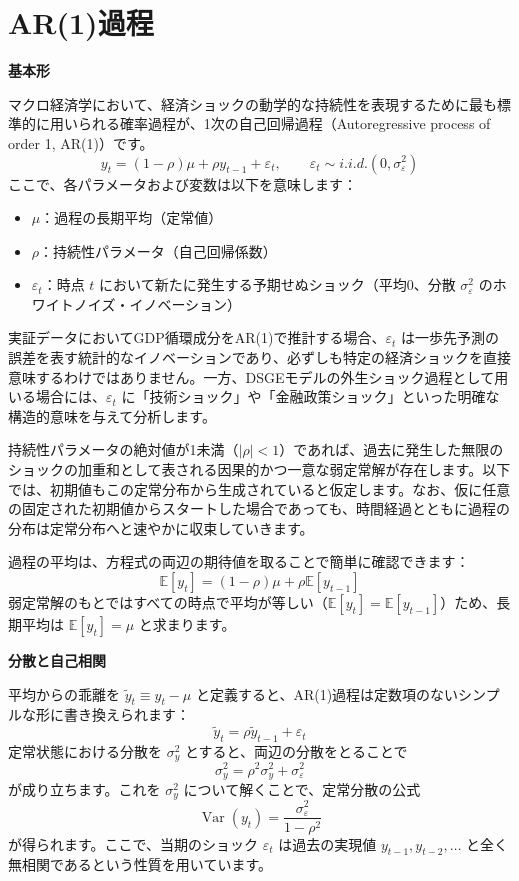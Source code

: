 \documentclass[
  japanese,
  lualatex,
  ja=standard,
  12pt,
  a4paper]{ltjsarticle}
\providecommand{\tightlist}{%
  \setlength{\itemsep}{0pt}\setlength{\parskip}{0pt}}
\begin{document}
\section{AR(1)過程}\label{ar1ux904eux7a0b}

\textbf{基本形}

マクロ経済学において、経済ショックの動学的な持続性を表現するために最も標準的に用いられる確率過程が、1次の自己回帰過程（Autoregressive
process of order 1, AR(1)）です。 \[
y_t=(1-\rho)\mu+\rho y_{t-1}+\varepsilon_t,
\qquad
\varepsilon_t\sim i.i.d.(0,\sigma_\varepsilon^2)
\] ここで、各パラメータおよび変数は以下を意味します：

\begin{itemize}
\tightlist
\item
  \(\mu\)：過程の長期平均（定常値）
\item
  \(\rho\)：持続性パラメータ（自己回帰係数）
\item
  \(\varepsilon_t\)：時点 \(t\)
  において新たに発生する予期せぬショック（平均0、分散
  \(\sigma_\varepsilon^2\) のホワイトノイズ・イノベーション）
\end{itemize}

実証データにおいてGDP循環成分をAR(1)で推計する場合、\(\varepsilon_t\)
は一歩先予測の誤差を表す統計的なイノベーションであり、必ずしも特定の経済ショックを直接意味するわけではありません。一方、DSGEモデルの外生ショック過程として用いる場合には、\(\varepsilon_t\)
に「技術ショック」や「金融政策ショック」といった明確な構造的意味を与えて分析します。

持続性パラメータの絶対値が1未満（\(|\rho|<1\)）であれば、過去に発生した無限のショックの加重和として表される因果的かつ一意な弱定常解が存在します。以下では、初期値もこの定常分布から生成されていると仮定します。なお、仮に任意の固定された初期値からスタートした場合であっても、時間経過とともに過程の分布は定常分布へと速やかに収束していきます。

過程の平均は、方程式の両辺の期待値を取ることで簡単に確認できます： \[
\mathbb{E}[y_t]
=
(1-\rho)\mu+\rho\mathbb{E}[y_{t-1}]
\]
弱定常解のもとではすべての時点で平均が等しい（\(\mathbb{E}[y_t]=\mathbb{E}[y_{t-1}]\)）ため、長期平均は
\(\mathbb{E}[y_t]=\mu\) と求まります。

\textbf{分散と自己相関}

平均からの乖離を \(\tilde{y}_t\equiv y_t-\mu\)
と定義すると、AR(1)過程は定数項のないシンプルな形に書き換えられます： \[
\tilde{y}_t=\rho\tilde{y}_{t-1}+\varepsilon_t
\] 定常状態における分散を \(\sigma_y^2\)
とすると、両辺の分散をとることで \[
\sigma_y^2
=
\rho^2\sigma_y^2+\sigma_\varepsilon^2
\] が成り立ちます。これを \(\sigma_y^2\)
について解くことで、定常分散の公式 \[
\operatorname{Var}(y_t)
=
\frac{\sigma_\varepsilon^2}{1-\rho^2}
\] が得られます。ここで、当期のショック \(\varepsilon_t\) は過去の実現値
\(y_{t-1}, y_{t-2}, \ldots\)
と全く無相関であるという性質を用いています。
\end{document}

